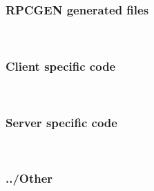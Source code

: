 \documentclass{article}
\begin{document}
  \subsubsection{RPCGEN generated files}~
  	      
 	     
	     
 
 \subsubsection{Client specific code}~
    
    \subsubsection{Server specific code}~
    
    \subsubsection{../Other}~
    
    
     
\end{document}
